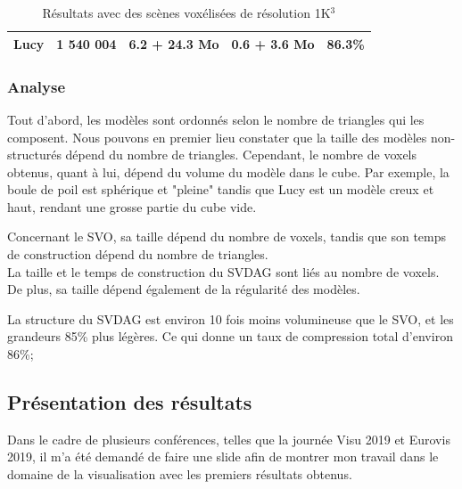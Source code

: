 \documentclass[12pt,a4paper,twoside]{article}
\begin{document}
\begin{table}[H]
\begin{tabular}{lllll}
            \multicolumn{1}{|l|}{Lucy}     & \multicolumn{1}{l|}{1 540 004}                                                  & \multicolumn{1}{l|}{6.2 + 24.3 Mo}                                                              & \multicolumn{1}{l|}{0.6 + 3.6 Mo}                                                                 & \multicolumn{1}{l|}{86.3\%}                                                            \\ \hline
        \end{tabular}
        \caption{Résultats avec des scènes voxélisées de résolution 1K$^{3}$}
    \end{table}

    \newpage
    \subsubsection{Analyse}

    Tout d'abord, les modèles sont ordonnés selon le nombre de triangles qui les composent.
    Nous pouvons en premier lieu constater que la taille des modèles non-structurés dépend du nombre de triangles.
    Cependant, le nombre de voxels obtenus, quant à lui, dépend du volume du modèle dans le cube.
    Par exemple, la boule de poil est sphérique et "pleine" tandis que Lucy est un modèle creux et haut, rendant une grosse partie du cube vide.

    Concernant le SVO, sa taille dépend du nombre de voxels, tandis que son temps de construction dépend du nombre de triangles.\\
    La taille et le temps de construction du SVDAG sont liés au nombre de voxels. De plus, sa taille dépend également de la régularité des modèles.

    La structure du SVDAG est environ 10 fois moins volumineuse que le SVO, et les grandeurs 85\% plus légères. Ce qui donne un taux de compression total d'environ 86\%;

    \subsection{Présentation des résultats}

    Dans le cadre de plusieurs conférences, telles que la journée Visu 2019 et Eurovis 2019, il m'a été
    demandé de faire une slide afin de montrer mon travail dans le domaine de la visualisation avec les premiers résultats obtenus.
\end{document}
